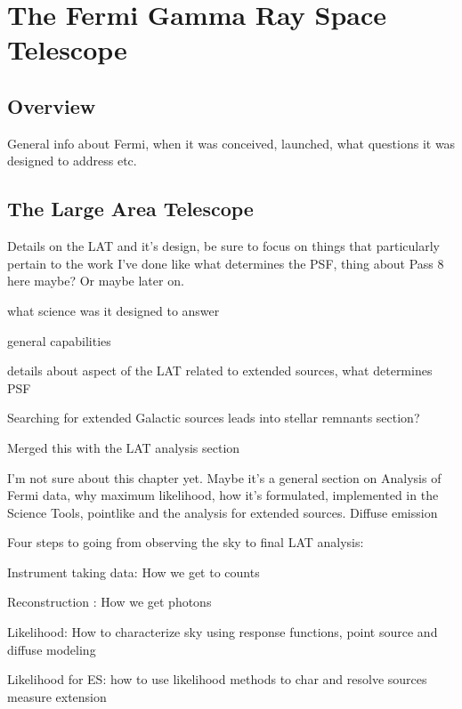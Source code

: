 \chapter{The Fermi Gamma Ray Space Telescope}
\label{chap:LAT}
\section{Overview}
General info about Fermi, when it was conceived, launched, what questions it was designed to address etc.
\section{The Large Area Telescope}
Details on the LAT and it's design, be sure to focus on things that particularly pertain to the work I've done like what determines the PSF, thing about Pass 8 here maybe? Or maybe later on. 

what science was it designed to answer

general capabilities

details about aspect of the LAT related to extended sources, what determines PSF

Searching for extended Galactic sources leads into stellar remnants section?

Merged this with the LAT analysis  section

I'm not sure about this chapter yet. Maybe it's a general section on Analysis of Fermi data, why maximum likelihood, how it's formulated,  implemented in the Science Tools, pointlike and the analysis for extended sources. Diffuse emission

Four steps to going from observing the sky to final LAT analysis:

Instrument taking data: How we get to counts

Reconstruction : How we get photons

Likelihood: How to characterize sky using response functions, point source  and diffuse modeling

Likelihood for ES: how to use likelihood methods to char and resolve sources measure  extension
